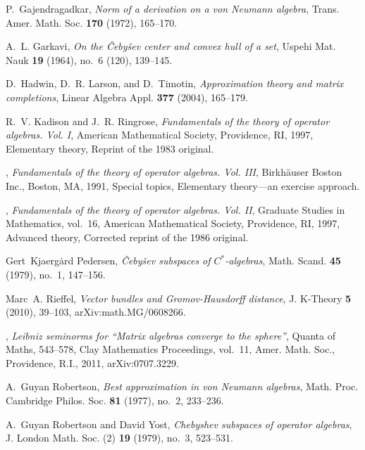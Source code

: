 \documentclass[12pt]{amsart}
\newcommand{\<}{\langle}
\renewcommand{\>}{\rangle}
\theoremstyle{definition}   %
\begin{document}
\begin{thebibliography}{99}
P.~Gajendragadkar, \emph{Norm of a derivation on a von {N}eumann algebra},
  Trans. Amer. Math. Soc. \textbf{170} (1972), 165--170. 

A.~L. Garkavi, \emph{On the \v {C}eby\v sev center and convex hull of a set},
  Uspehi Mat. Nauk \textbf{19} (1964), no.~6 (120), 139--145. 

D.~Hadwin, D.~R. Larson, and D.~Timotin, \emph{Approximation theory and matrix
  completions}, Linear Algebra Appl. \textbf{377} (2004), 165--179.

R.~V. Kadison and J.~R. Ringrose, \emph{Fundamentals of the theory of operator
  algebras. {V}ol. {I}}, American Mathematical Society, Providence, RI, 1997,
  Elementary theory, Reprint of the 1983 original. 

\bysame, \emph{Fundamentals of the theory of
  operator algebras. {V}ol. {III}}, Birkh\"auser Boston Inc., Boston, MA, 1991,
  Special topics, Elementary theory---an exercise approach. 

\bysame, \emph{Fundamentals of the theory of operator algebras. {V}ol. {II}},
  Graduate Studies in Mathematics, vol.~16, American Mathematical Society,
  Providence, RI, 1997, Advanced theory, Corrected reprint of the 1986
  original. 

Gert~Kjaerg{\.a}rd Pedersen, \emph{\v {C}eby\v sev subspaces of {$C^{\ast}
  $}-algebras}, Math. Scand. \textbf{45} (1979), no.~1, 147--156. 
  
Marc~A. Rieffel,   
\emph{Vector bundles and {G}romov-{H}ausdorff distance}, J. K-Theory
 \textbf{5} (2010), 39--103, arXiv:math.MG/0608266.

\bysame, 
\emph{Leibniz seminorms for ``{M}atrix algebras converge to
  the sphere''}, Quanta of Maths, 543--578, Clay Mathematics Proceedings,
  vol.~11, Amer. Math. Soc., Providence, R.I., 2011, arXiv:0707.3229.

A.~Guyan Robertson, \emph{Best approximation in von {N}eumann algebras}, Math.
  Proc. Cambridge Philos. Soc. \textbf{81} (1977), no.~2, 233--236.

A.~Guyan Robertson and David Yost, \emph{Chebyshev subspaces of operator
  algebras}, J. London Math. Soc. (2) \textbf{19} (1979), no.~3, 523--531.


\end{thebibliography}
\end{document}
